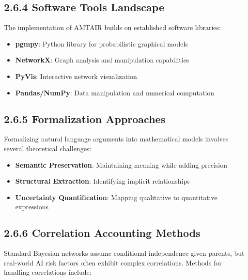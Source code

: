 \documentclass[
  11pt,
  letterpaper,
]{book}
\providecommand{\tightlist}{%
  \setlength{\itemsep}{0pt}\setlength{\parskip}{0pt}}
\begin{document}
\textcite{koller2009}

\subsection*{2.6.4 Software Tools Landscape}\label{sec-software-tools}

The implementation of AMTAIR builds on established software libraries:

\begin{itemize}
\tightlist
\item
  \textbf{pgmpy}: Python library for probabilistic graphical models
\item
  \textbf{NetworkX}: Graph analysis and manipulation capabilities
\item
  \textbf{PyVis}: Interactive network visualization
\item
  \textbf{Pandas/NumPy}: Data manipulation and numerical computation
\end{itemize}

\subsection*{2.6.5 Formalization Approaches}\label{sec-formalization}

Formalizing natural language arguments into mathematical models involves
several theoretical challenges:

\begin{itemize}
\tightlist
\item
  \textbf{Semantic Preservation}: Maintaining meaning while adding
  precision
\item
  \textbf{Structural Extraction}: Identifying implicit relationships
\item
  \textbf{Uncertainty Quantification}: Mapping qualitative to
  quantitative expressions
\end{itemize}

\textcite{pollock1995}

\subsection*{2.6.6 Correlation Accounting
Methods}\label{sec-correlation-methods}

Standard Bayesian networks assume conditional independence given
parents, but real-world AI risk factors often exhibit complex
correlations. Methods for handling correlations include:
\end{document}
